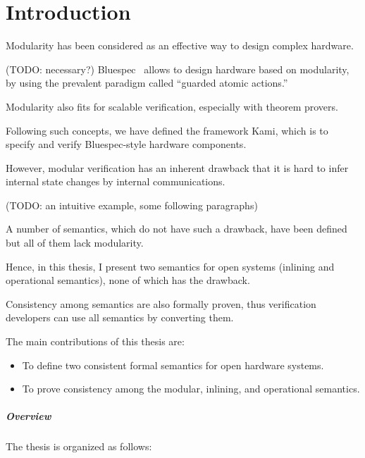 \chapter{Introduction}

Modularity has been considered as an effective way to design complex
hardware.

(TODO: necessary?) Bluespec~\cite{bsdef, bsref} allows to design
hardware based on modularity, by using the prevalent paradigm called
``guarded atomic actions.''

Modularity also fits for scalable verification, especially with
theorem provers.

Following such concepts, we have defined the framework Kami, which is
to specify and verify Bluespec-style hardware components.

However, modular verification has an inherent drawback that it is hard
to infer internal state changes by internal communications.

(TODO: an intuitive example, some following paragraphs)

A number of semantics, which do not have such a drawback, have been
defined but all of them lack modularity.

Hence, in this thesis, I present two semantics for open systems
(inlining and operational semantics), none of which has the drawback.

Consistency among semantics are also formally proven, thus
verification developers can use all semantics by converting them.

The main contributions of this thesis are:
\begin{itemize}
\item To define two consistent formal semantics for open hardware
  systems.
\item To prove consistency among the modular, inlining, and
  operational semantics.
\end{itemize}

\paragraph{Overview} The thesis is organized as follows:





